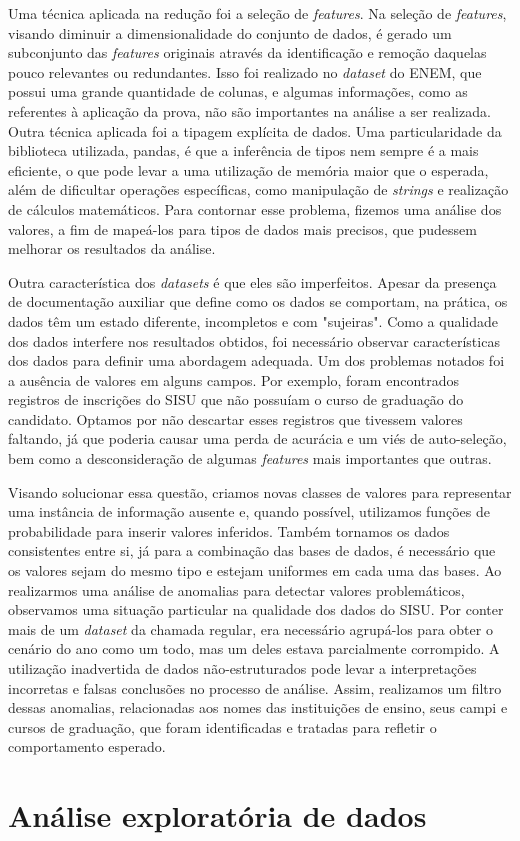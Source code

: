 Uma técnica aplicada na redução foi a seleção de \textit{features}. Na seleção de \textit{features}, visando diminuir a dimensionalidade
 do conjunto de dados, é gerado um subconjunto das \textit{features} originais através da identificação e remoção daquelas pouco relevantes
ou redundantes. Isso foi realizado no \textit{dataset} do ENEM, que possui uma grande quantidade de colunas, e algumas informações, 
como as referentes à aplicação da prova, não são importantes na análise a ser realizada. 
Outra técnica aplicada foi a tipagem explícita de dados. Uma particularidade da biblioteca utilizada, pandas, é que a inferência de tipos 
nem sempre é a mais eficiente, o que pode levar a uma utilização de memória maior que o esperada, além de dificultar operações específicas, 
como manipulação de \textit{strings} e realização de cálculos matemáticos. Para contornar esse problema, fizemos uma análise dos valores, a fim de mapeá-los
para tipos de dados mais precisos, que pudessem melhorar os resultados da análise.

Outra característica dos \textit{datasets} é que eles são imperfeitos. Apesar da presença de documentação auxiliar que define como os dados se comportam, na prática, os dados têm um estado diferente, incompletos e com "sujeiras". Como a qualidade dos dados interfere nos resultados obtidos, foi necessário observar características dos dados para definir uma abordagem adequada.
Um dos problemas notados foi a ausência de valores em alguns campos. Por exemplo, foram encontrados registros de inscrições do SISU que não possuíam o curso de graduação do candidato. Optamos por não descartar esses registros que tivessem valores faltando, já que poderia causar uma perda de acurácia e um viés de auto-seleção, bem como a desconsideração de algumas \textit{features} mais importantes que outras. 

Visando solucionar essa questão, criamos novas classes de valores para representar uma instância de informação ausente e, quando possível, utilizamos funções de probabilidade para inserir valores inferidos. Também tornamos os dados consistentes entre si, já para a combinação das bases de dados, é necessário que os valores sejam do mesmo tipo e estejam uniformes em cada uma das bases. Ao realizarmos uma análise de anomalias para detectar valores problemáticos, observamos uma situação particular na qualidade dos dados do SISU. Por conter mais de um \textit{dataset} da chamada regular, era necessário agrupá-los para obter o cenário do ano como um todo, mas um deles estava parcialmente corrompido. A utilização inadvertida de dados não-estruturados pode levar a interpretações incorretas e falsas conclusões no processo de análise. Assim, realizamos um filtro dessas anomalias, relacionadas aos nomes das instituições de ensino, seus campi e cursos de graduação, que foram identificadas e tratadas para refletir o comportamento esperado. 
\section{Análise exploratória de dados}







